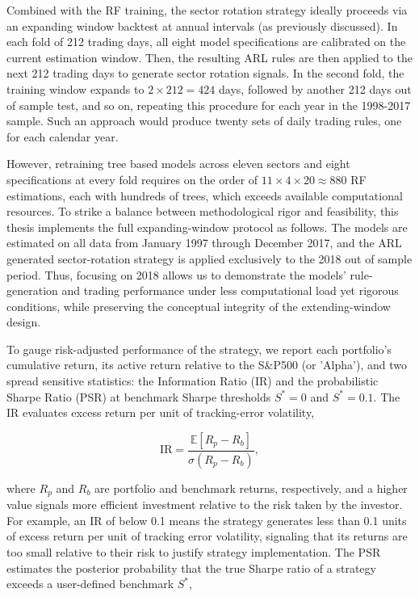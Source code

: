 Combined with the RF training, the sector rotation strategy ideally proceeds via an expanding window backtest at annual intervals (as previously discussed). In each fold of 212 trading days, all eight model specifications are calibrated on the current estimation window. Then, the resulting ARL rules are then applied to the next 212 trading days to generate sector rotation signals. In the second fold, the training window expands to $2\times212=424$ days, followed by another 212 days out of sample test, and so on, repeating this procedure for each year in the 1998-2017 sample. Such an approach would produce twenty sets of daily trading rules, one for each calendar year.

However, retraining tree based models across eleven sectors and eight specifications at every fold requires on the order of $11\times4\times20\approx880$ RF estimations, each with hundreds of trees, which exceeds available computational resources. To strike a balance between methodological rigor and feasibility, this thesis implements the full expanding-window protocol as follows. The models are estimated on all data from January 1997 through December 2017, and the ARL generated sector-rotation strategy is applied exclusively to the 2018 out of sample period. Thus, focusing on 2018 allows us to demonstrate the models' rule-generation and trading performance under less computational load yet rigorous conditions, while preserving the conceptual integrity of the extending-window design.


To gauge risk-adjusted performance of the strategy, we report each portfolio's cumulative return, its active return relative to the S\&P500 (or 'Alpha'), and two spread sensitive statistics: the Information Ratio (IR) and the probabilistic Sharpe Ratio (PSR) at benchmark Sharpe thresholds $S^{*}=0$ and $S^{*}=0.1$. The IR evaluates excess return per unit of tracking-error volatility,

\begin{equation}
\mathrm{IR}=\frac{\mathbb{E}\left[R_{p}-R_{b}\right]}{\sigma\left(R_{p}-R_{b}\right)},
\end{equation}

where $R_{p}$ and $R_{b}$ are portfolio and benchmark returns, respectively, and a higher value signals more efficient investment relative to the risk taken by the investor. For example, an IR of below 0.1 means the strategy generates less than 0.1 units of excess return per unit of tracking error volatility, signaling that its returns are too small relative to their risk to justify strategy implementation. The PSR estimates the posterior probability that the true Sharpe ratio of a strategy exceeds a user-defined benchmark $S^{*}$,

